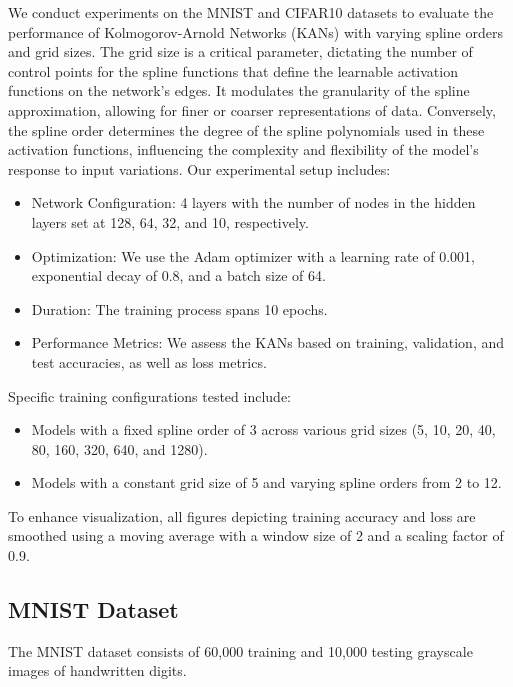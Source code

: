 \documentclass{article}
\begin{document}
We conduct experiments on the MNIST and CIFAR10 datasets to evaluate the performance of Kolmogorov-Arnold Networks (KANs) with varying spline orders and grid sizes.
The grid size is a critical parameter, dictating the number of control points for the spline functions that define the learnable activation functions on the network's edges.
It modulates the granularity of the spline approximation, allowing for finer or coarser representations of data.
Conversely, the spline order determines the degree of the spline polynomials used in these activation functions, influencing the complexity and flexibility of the model's response to input variations.
\newline
\newline
Our experimental setup includes:
\begin{itemize}
    \item Network Configuration: 4 layers with the number of nodes in the hidden layers set at 128, 64, 32, and 10, respectively.
    \item Optimization: We use the Adam optimizer with a learning rate of 0.001, exponential decay of 0.8, and a batch size of 64.
    \item Duration: The training process spans 10 epochs.
    \item Performance Metrics: We assess the KANs based on training, validation, and test accuracies, as well as loss metrics.
\end{itemize}

\noindent Specific training configurations tested include:
\begin{itemize}
    \item Models with a fixed spline order of 3 across various grid sizes (5, 10, 20, 40, 80, 160, 320, 640, and 1280).
    \item Models with a constant grid size of 5 and varying spline orders from 2 to 12.
\end{itemize}

\noindent To enhance visualization, all figures depicting training accuracy and loss are smoothed using a moving average with a window size of 2 and a scaling factor of 0.9.
\newline

\subsection{MNIST Dataset}\label{subsec:mnist}

The MNIST dataset consists of 60,000 training and 10,000 testing grayscale images of handwritten digits.
\end{document}
